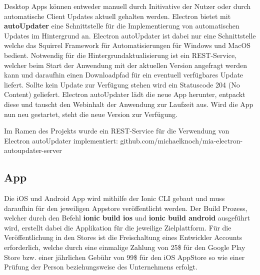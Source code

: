 Desktop Apps können entweder manuell durch Initivative der Nutzer oder durch
automatische Client Updates aktuell gehalten werden.
Electron bietet mit \textbf{autoUpdater} eine Schnittstelle für die Implementierung
von automatischen Updates im Hintergrund an.
Electron autoUpdater ist dabei nur eine Schnittstelle welche das Squirrel Framework
für Automatisierungen für Windows und MacOS bedient.
Notwendig für die Hintergrundaktualisierung ist ein REST-Service, welcher beim Start der Anwendung mit der
aktuellen Version angefragt werden kann
und daraufhin einen Downloadpfad für ein eventuell verfügbares Update liefert.
Sollte kein Update zur Verfügung stehen wird ein Statuscode 204 (No Content) geliefert.
Electron autoUpdater lädt die neue App herunter, entpackt diese und tauscht den Webinhalt der Anwendung zur Laufzeit aus.
Wird die App nun neu gestartet, steht die neue Version zur Verfügung.

Im Ramen des Projekts \projectname{} wurde ein REST-Service für die
Verwendung von Electron autoUpdater implementiert:
github.com/michaelknoch/mia-electron-autoupdater-server

\subsection{App}

Die iOS und Android App wird mithilfe der Ionic \ac{CLI} gebaut und muss daraufhin für den
jeweiligen Appstore veröffentlicht werden. Der Build Prozess,
welcher durch den Befehl \textbf{ionic build ios} und \textbf{ionic build android} ausgeführt wird,
erstellt dabei die Applikation für die jeweilige Zielplattform.
Für die Veröffentlichung in den Stores ist die Freischaltung eines Entwickler Accounts erforderlich,
welche durch eine einmalige Zahlung von 25\$ für den Google Play Store bzw. einer jährlichen Gebühr von 99\$
für den iOS AppStore so wie einer Prüfung der Person beziehungsweise des Unternehmens erfolgt.
